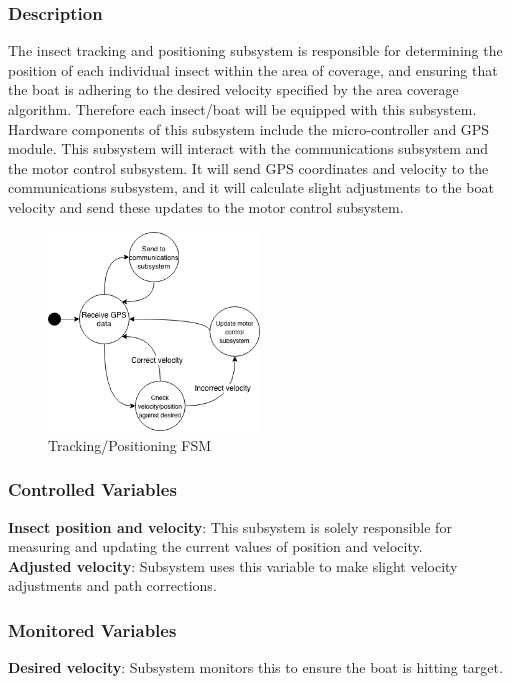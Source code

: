 \documentclass[11pt]{article}
\begin{document}
\subsubsection{Description}
The insect tracking and positioning subsystem is responsible for determining the position of each individual insect within the area of coverage, and ensuring that the boat is adhering to the desired velocity specified by the area coverage algorithm. Therefore each insect/boat will be equipped with this subsystem. Hardware components of this subsystem include the micro-controller and GPS module. This subsystem will interact with the communications subsystem and the motor control subsystem. It will send GPS coordinates and velocity to the communications subsystem, and it will calculate slight adjustments to the boat velocity and send these updates to the motor control subsystem.
\begin{figure}[H]
   \centering
   \includegraphics[width=0.5\textwidth]{img/position_ctrl_fsm.png}
   \caption{Tracking/Positioning FSM}
   \label{fig:fsm}
\end{figure}

\subsubsection{Controlled Variables}
\textbf{Insect position and velocity}: This subsystem is solely responsible for measuring and updating the current values of position and velocity.\\
\textbf{Adjusted velocity}: Subsystem uses this variable to make slight velocity adjustments and path corrections.

\subsubsection{Monitored Variables}
\textbf{Desired velocity}: Subsystem monitors this to ensure the boat is hitting target.
\end{document}
